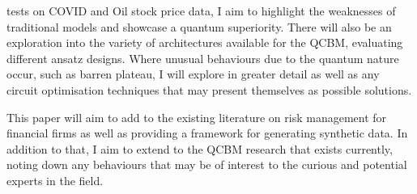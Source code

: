 \documentclass[12pt]{article}
\newcommand{\newp}
    {
    \vskip 0.5cm 
  }
\numberwithin{equation}{section}
\begin{document}
tests on COVID and Oil stock price data, I aim to highlight the weaknesses of traditional models 
and showcase a quantum superiority.
There will also be an exploration into the variety of architectures 
available for the QCBM, evaluating different ansatz designs. Where unusual behaviours
due to the quantum nature occur, such as barren plateau, I will explore in greater detail 
as well as any circuit optimisation techniques that may present themselves as 
possible solutions. 
\newp
This paper will aim to add to the existing literature on risk management for 
financial firms as well as providing a framework for generating synthetic 
data. In addition to that, I aim to extend to the QCBM research that exists 
currently, noting down any behaviours that may be of interest to the curious 
and potential 
experts in the field. 
\clearpage
\end{document}
